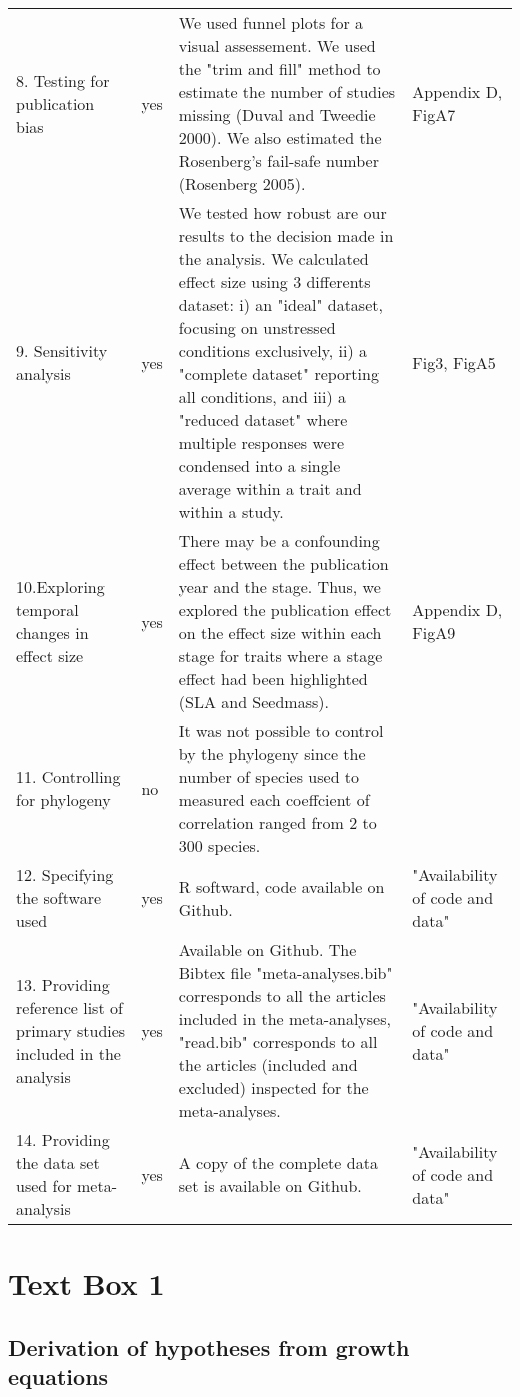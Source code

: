 \documentclass[a4paper]{article}\usepackage[]{graphicx}\usepackage[]{color}
\begin{document}
\begin{table}[h!]
\begin{tabular}{p{3cm} p{1cm} p{10cm} p{3cm}}
  8. Testing for publication bias &	yes	& We used funnel plots for a visual assessement. We  used the "trim and fill" method to estimate the number of studies missing (Duval and Tweedie 2000). We also estimated the Rosenberg’s fail-safe number (Rosenberg 2005). 	&  Appendix D, FigA7\\
  9. Sensitivity analysis &	yes &	We tested how robust are our results to the decision made in the analysis. We calculated effect size using 3 differents dataset: i) an  "ideal" dataset, focusing on unstressed conditions exclusively, ii) a "complete dataset" reporting all conditions, and iii) a "reduced dataset" where multiple responses were condensed into a single average within a trait and within a study. &	Fig3, FigA5 \\
  10.Exploring temporal changes in effect size &	yes	& There may be a confounding effect between the publication year and the stage. Thus, we explored the publication effect on the effect size within each stage for traits where a stage effect had been highlighted (SLA and Seedmass). & Appendix D, FigA9 \\
  11. Controlling for phylogeny &	no &	It was not possible to control by the phylogeny since the number of species used to measured each coeffcient of correlation ranged from 2 to 300 species. &	\\
  12. Specifying the software used &	yes	& R softward, code available on Github. & "Availability of code and data" \\
 13. Providing reference list of primary studies included in the analysis &	yes &	Available on Github. The Bibtex file "meta-analyses.bib" corresponds to all the articles included in the meta-analyses, "read.bib" corresponds to all the articles (included and excluded) inspected for the meta-analyses.	& "Availability of code and data" \\
  14. Providing the data set used for meta-analysis  &	yes &	A copy of the complete data set is available on Github.	& "Availability of code and data" \\
   \hline
\end{tabular}
\end{table}


\clearpage
\section*{Text Box 1} \label{sec:growth}

\subsection*{Derivation of hypotheses from growth equations} 
\end{document}
